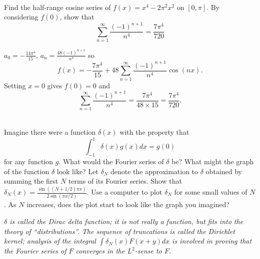 \documentclass[12pt]{article}
\begin{document}
\vspace{0.5cm}

\begin{question}\ \\
Find the half-range cosine series of $f(x)=x^4-2\pi^2x^2$ on $[0,\pi]$. By considering $f(0)$, show that
\[\sum_{n=1}^{\infty}\frac{(-1)^{n+1}}{n^4}=\frac{7\pi^4}{720}\]
\end{question}

\begin{answer}
$a_0=-\frac{14\pi^4}{15}$, $a_n=\frac{48(-1)^{n+1}}{n^4}$ so
\[f(x)=-\frac{7\pi^4}{15}+48\sum_{n=1}^{\infty}\frac{(-1)^{n+1}}{n^4}\cos(nx).\]
Setting $x=0$ gives $f(0)=0$ and
\[\sum_{n=1}^{\infty}\frac{(-1)^{n+1}}{n^4}=\frac{7\pi^4}{48\times 15}=\frac{7\pi^4}{720}.\]
\end{answer}
\newpage

\vspace{0.5cm}

\begin{question}\ \\
Imagine there were a function $\delta(x)$ with the property that
\[\int_{-1}^1\delta(x)g(x)dx=g(0)\]
for any function $g$. What would the Fourier series of $\delta$ be? What might the graph of the function $\delta$ look like? Let $\delta_N$ denote the approximation to $\delta$ obtained by summing the first $N$ terms of its Fourier series. Show that $\delta_N(x)=\frac{\sin((N+1/2)\pi x)}{2\sin(\pi x/2)}$. Use a computer to plot $\delta_N$ for some small values of $N$. As $N$ increases, does the plot start to look like the graph you imagined?

{\em $\delta$ is called the Dirac delta function; it is not really a function, but fits into the theory of ``distributions''. The sequence of truncations is called the Dirichlet kernel; analysis of the integral $\int\delta_N(x)F(x+y)dx$ is involved in proving that the Fourier series of $F$ converges in the $L^2$-sense to $F$.}
\end{question}
\end{document}
